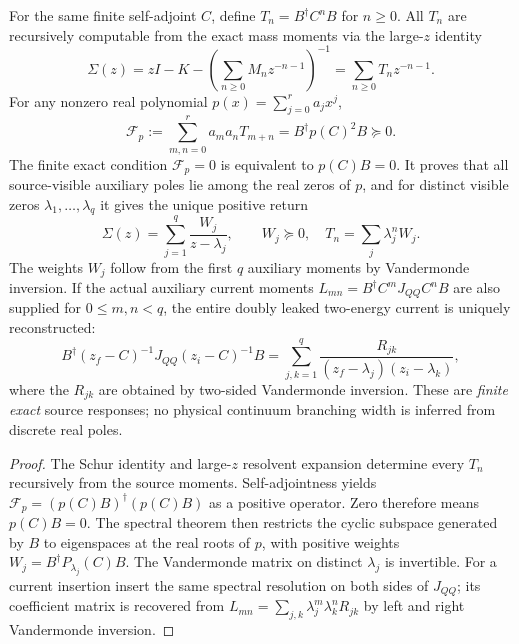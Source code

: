 \documentclass[12pt,a4paper]{article}
\begin{document}
\begin{theorem}
\label{p10:thm:v377-multipole-flatness}
For the same finite self-adjoint $C$, define
$T_n=B^\dagger C^nB$ for $n\ge0$. All $T_n$ are recursively
computable from the exact mass moments via the large-$z$ identity
\[
 \Sigma(z)=zI-K-\left(\sum_{n\ge0}M_nz^{-n-1}\right)^{-1}
 =\sum_{n\ge0}T_nz^{-n-1}.
\]
For any nonzero real polynomial $p(x)=\sum_{j=0}^r a_jx^j$,
\[
 \boxed{\mathcal F_p:=\sum_{m,n=0}^r a_ma_nT_{m+n}
 =B^\dagger p(C)^2B\succeq0.}
\]
The finite exact condition $\mathcal F_p=0$ is equivalent to
$p(C)B=0$. It proves that all source-visible auxiliary poles lie
among the real zeros of $p$, and for distinct visible zeros
$\lambda_1,\ldots,\lambda_q$ it gives the unique positive return
\[
 \boxed{\Sigma(z)=\sum_{j=1}^q\frac{W_j}{z-\lambda_j},
 \qquad W_j\succeq0,\quad
 T_n=\sum_j\lambda_j^nW_j.}
\]
The weights $W_j$ follow from the first $q$ auxiliary moments by
Vandermonde inversion. If the actual auxiliary current moments
$L_{mn}=B^\dagger C^mJ_{QQ}C^nB$ are also supplied for
$0\le m,n<q$, the entire doubly leaked two-energy current is
uniquely reconstructed:
\[
 \boxed{B^\dagger(z_f-C)^{-1}J_{QQ}(z_i-C)^{-1}B
 =\sum_{j,k=1}^q\frac{R_{jk}}{(z_f-\lambda_j)(z_i-\lambda_k)},}
\]
where the $R_{jk}$ are obtained by two-sided Vandermonde inversion.
These are \emph{finite exact} source responses; no physical continuum
branching width is inferred from discrete real poles.
\end{theorem}
\begin{proof}
The Schur identity and large-$z$ resolvent expansion determine every
$T_n$ recursively from the source moments. Self-adjointness yields
$\mathcal F_p=(p(C)B)^\dagger(p(C)B)$ as a positive operator.
Zero therefore means $p(C)B=0$. The spectral theorem then
restricts the cyclic subspace generated by $B$ to eigenspaces
at the real roots of $p$, with positive weights
$W_j=B^\dagger P_{\lambda_j}(C)B$.
The Vandermonde matrix on distinct $\lambda_j$ is invertible.
For a current insertion insert the same spectral resolution on
both sides of $J_{QQ}$; its coefficient matrix is recovered from
$L_{mn}=\sum_{j,k}\lambda_j^m\lambda_k^nR_{jk}$ by
left and right Vandermonde inversion.
\end{proof}
\end{document}
